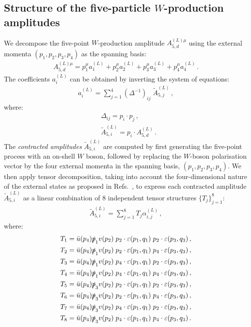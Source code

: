 \documentclass[main.tex]{subfiles}
\begin{document}
\subsection{Structure of the five-particle $W$-production amplitudes}
\label{wyjsec:A5amplitude}
We decompose the five-point $W$-production amplitude $A_{5,d}^{(L)\mu}$ using the external momenta $(p_1,p_2,p_3,p_4)$ as the spanning basis:
\begin{align}
A_{5,d}^{(L)\mu} = p_1^{\mu} a^{(L)}_{1}  + p_2^{\mu} a^{(L)}_{2} + p_3^{\mu} a^{(L)}_{3} + p_4^{\mu} a^{(L)}_{4} \,.
\end{align}
The coefficients $a^{(L)}_{i}$ can be obtained by inverting the system of equations:
\begin{align}
a^{(L)}_{i} = \sum_{j=1}^{4} \left(\Delta^{-1}\right)_{ij} \; \tilde{A}_{5,j}^{(L)} \,,
\label{Wyjeq:solveai}
\end{align}
where:
\begin{align}
\label{Wyjeq:Delta}
&\Delta_{ij} = p_i\cdot p_j \,, \\
\label{Wyjeq:A5i}
&\tilde{A}_{5,i}^{(L)} = p_i \cdot A_{5,d}^{(L)} \,.
\end{align}
The \textit{contracted amplitudes} $\tilde{A}_{5,i}^{(L)}$ are computed by first generating the five-point process with an on-shell $W$ boson, followed by
replacing the $W$-boson polarisation vector by the four external momenta in the spanning basis, $(p_1,p_2,p_3,p_4)$.
We then apply tensor decomposition, taking into account the four-dimensional nature of the external states 
as proposed in Refs.~\cite{Peraro:2019cjj,Peraro:2020sfm}, to express each contracted amplitude $\tilde{A}_{5,i}^{(L)}$ as a linear combination of 8 independent tensor structures $\{T_j\}_{j=1}^8$:
\begin{align}
\tilde{A}_{5,i}^{(L)} = \sum_{j=1}^{8} T_{j} \alpha_{i,j}^{(L)} \,,
\end{align}
where:
\begin{align}
T_{1}  & = \bar{u}(p_4) \slashed{p}_{1} v(p_2) \; p_{2}\cdot \varepsilon(p_1,q_1) \; p_{2}\cdot\varepsilon(p_3,q_3) \,, \nonumber \\ 
T_{2}  & = \bar{u}(p_4) \slashed{p}_{1} v(p_2) \; p_{2}\cdot \varepsilon(p_1,q_1) \; p_{4}\cdot\varepsilon(p_3,q_3) \,, \nonumber \\ 
T_{3}  & = \bar{u}(p_4) \slashed{p}_{1} v(p_2) \; p_{4}\cdot \varepsilon(p_1,q_1) \; p_{2}\cdot\varepsilon(p_3,q_3) \,, \nonumber \\ 
T_{4}  & = \bar{u}(p_4) \slashed{p}_{1} v(p_2) \; p_{4}\cdot \varepsilon(p_1,q_1) \; p_{4}\cdot\varepsilon(p_3,q_3) \,, \\
T_{5}  & = \bar{u}(p_4) \slashed{p}_{3} v(p_2) \; p_{2}\cdot \varepsilon(p_1,q_1) \; p_{2}\cdot\varepsilon(p_3,q_3) \,, \nonumber \\ 
T_{6}  & = \bar{u}(p_4) \slashed{p}_{3} v(p_2) \; p_{2}\cdot \varepsilon(p_1,q_1) \; p_{4}\cdot\varepsilon(p_3,q_3) \,, \nonumber \\ 
T_{7}  & = \bar{u}(p_4) \slashed{p}_{3} v(p_2) \; p_{4}\cdot \varepsilon(p_1,q_1) \; p_{2}\cdot\varepsilon(p_3,q_3) \,, \nonumber \\ 
T_{8}  & = \bar{u}(p_4) \slashed{p}_{3} v(p_2) \; p_{4}\cdot \varepsilon(p_1,q_1) \; p_{4}\cdot\varepsilon(p_3,q_3) \,. \nonumber
\end{align}
\end{document}
